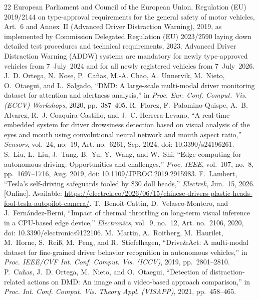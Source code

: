 \documentclass[conference]{IEEEtran}
\begin{document}
\begin{thebibliography}{22}
\sloppy
{} European Parliament and Council of the European Union, Regulation (EU) 2019/2144 on type-approval requirements for the general safety of motor vehicles, Art.~6 and Annex~II (Advanced Driver Distraction Warning), 2019, as implemented by Commission Delegated Regulation (EU) 2023/2590 laying down detailed test procedures and technical requirements, 2023. Advanced Driver Distraction Warning (ADDW) systems are mandatory for newly type-approved vehicles from 7~July~2024 and for all newly registered vehicles from 7~July~2026.
 J.~D. Ortega, N.~Kose, P.~Ca\~{n}as, M.-A. Chao, A.~Unnervik, M.~Nieto, O.~Otaegui, and L.~Salgado, ``DMD: A large-scale multi-modal driver monitoring dataset for attention and alertness analysis,'' in \emph{Proc. Eur. Conf. Comput. Vis. (ECCV) Workshops}, 2020, pp.~387--405.
 R.~Florez, F.~Palomino-Quispe, A.~B. Alvarez, R.~J. Coaquira-Castillo, and J.~C. Herrera-Levano, ``A real-time embedded system for driver drowsiness detection based on visual analysis of the eyes and mouth using convolutional neural network and mouth aspect ratio,'' \emph{Sensors}, vol.~24, no.~19, Art. no.~6261, Sep. 2024, doi: 10.3390/s24196261.
 S.~Liu, L.~Liu, J.~Tang, B.~Yu, Y.~Wang, and W.~Shi, ``Edge computing for autonomous driving: Opportunities and challenges,'' \emph{Proc. IEEE}, vol.~107, no.~8, pp.~1697--1716, Aug. 2019, doi: 10.1109/JPROC.2019.2915983.
 F.~Lambert, ``Tesla's self-driving safeguards fooled by \$30 doll heads,'' \emph{Electrek}, Jun.~15, 2026. [Online]. Available: \url{https://electrek.co/2026/06/15/chinese-drivers-plastic-heads-fool-tesla-autopilot-camera/}.
 T.~Benoit-Cattin, D.~Velasco-Montero, and J.~Fern\'{a}ndez-Berni, ``Impact of thermal throttling on long-term visual inference in a CPU-based edge device,'' \emph{Electronics}, vol.~9, no.~12, Art. no.~2106, 2020, doi: 10.3390/electronics9122106.
 M.~Martin, A.~Roitberg, M.~Haurilet, M.~Horne, S.~Rei{\ss}, M.~Peng, and R.~Stiefelhagen, ``Drive\&Act: A multi-modal dataset for fine-grained driver behavior recognition in autonomous vehicles,'' in \emph{Proc. IEEE/CVF Int. Conf. Comput. Vis. (ICCV)}, 2019, pp.~2801--2810.
 P.~Ca\~{n}as, J.~D. Ortega, M.~Nieto, and O.~Otaegui, ``Detection of distraction-related actions on DMD: An image and a video-based approach comparison,'' in \emph{Proc. Int. Conf. Comput. Vis. Theory Appl. (VISAPP)}, 2021, pp.~458--465.

\end{thebibliography}
\end{document}
